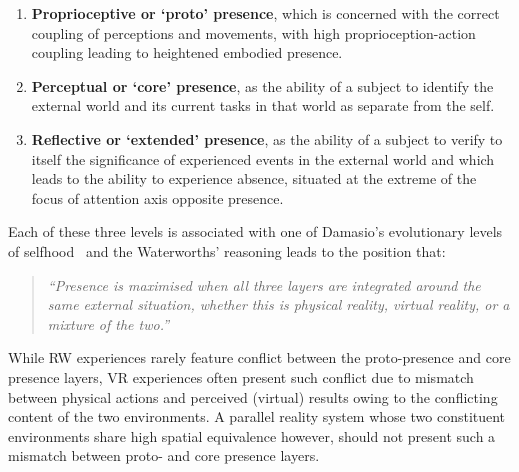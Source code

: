 \begin{enumerate}

\item \textbf{Proprioceptive or `proto' presence}, which is concerned with the correct coupling of perceptions and movements, with high proprioception-action coupling leading to heightened embodied presence.

\item \textbf{Perceptual or `core' presence}, as the ability of a subject to identify the external world and its current tasks in that world as separate from the self.

\item \textbf{Reflective or `extended' presence}, as the ability of a subject to verify to itself the significance of experienced events in the external world and which leads to the ability to experience absence, situated at the extreme of the focus of attention axis opposite presence.

\end{enumerate}

Each of these three levels is associated with one of Damasio's evolutionary levels of selfhood~\cite{Damasio1999} and the Waterworths' reasoning leads to the position that:

\begin{quote}
\textit{``Presence is maximised when all three layers are integrated around the same external situation, whether this is physical reality, virtual reality, or a mixture of the two.''}~\cite{Mantovani2010}
\end{quote}

While RW experiences rarely feature conflict between the proto-presence and core presence layers, VR experiences often present such conflict due to mismatch between physical actions and perceived (virtual) results owing to the conflicting content of the two environments. A parallel reality system whose two constituent environments share high spatial equivalence however, should not present such a mismatch between proto- and core presence layers.

